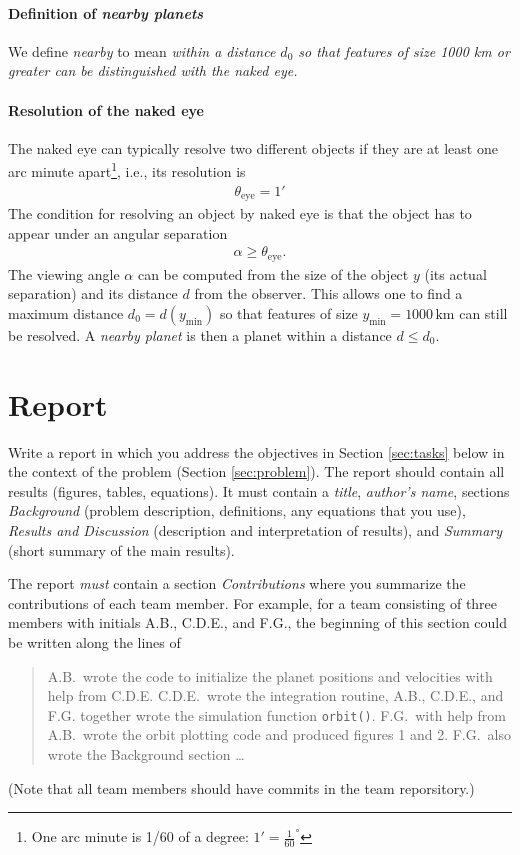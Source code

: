 \documentclass[letterpaper]{scrartcl}
\begin{document}
\paragraph{Definition of \emph{nearby planets}}

We define \emph{nearby} to mean \emph{within a distance $d_{0}$ so
  that features of size 1000 km or greater can be distinguished with
  the naked eye.}

\paragraph{Resolution of the naked eye}

The naked eye can typically resolve two different objects if they are
at least one arc minute apart\footnote{One arc minute is 1/60 of a
  degree: $1' = \frac{1}{60}^{\circ}$}, i.e., its resolution is
\begin{gather}
  \label{eq:thetaeye}
  \theta_{\text{eye}} = 1'
\end{gather}
The condition for resolving an object by naked eye is that the object
has to appear under an angular separation 
\begin{gather}
  \label{eq:resolution}
  \alpha \ge \theta_{\text{eye}}.
\end{gather}
The viewing angle $\alpha$ can be computed from the size of the object
$y$ (its actual separation) and its distance $d$ from the
observer. This allows one to find a maximum distance
$d_{0} = d(y_{\text{min}})$ so that features of size
$y_{\text{min}} = 1000\,\text{km}$ can still be resolved. A
\emph{nearby planet} is then a planet within a distance $d \le d_{0}$.


\section{Report}
\label{sec:report}

Write a report in which you address the objectives in Section
\ref{sec:tasks} below in the context of the problem (Section
\ref{sec:problem}). The report should contain all results (figures,
tables, equations). It must contain a \emph{title}, \emph{author's
  name}, sections \emph{Background} (problem description, definitions,
any equations that you use), \emph{Results and Discussion}
(description and interpretation of results), and \emph{Summary} (short
summary of the main results).

The report \emph{must} contain a section \emph{Contributions} where
you summarize the contributions of each team member. For example, for
a team consisting of three members with initials A.B., C.D.E., and
F.G., the beginning of this section could be written along the lines
of
\begin{quotation}
  A.B.\ wrote the code to initialize the planet positions and
  velocities with help from C.D.E. C.D.E.\ wrote the integration
  routine, A.B., C.D.E., and F.G. together wrote the simulation
  function \texttt{orbit()}. F.G.\ with help from A.B.\ wrote the
  orbit plotting code and produced figures 1 and 2. F.G.\ also wrote
  the Background section \dots
\end{quotation}
(Note that all team members should have commits in the team
reporsitory.)
\end{document}
